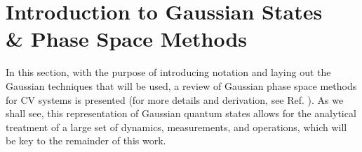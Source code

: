 \documentclass[%
reprint,
superscriptaddress,
nofootinbib,
 amsmath,amssymb,
prx,
floatfix,
]{revtex4-2}
\begin{document}








\section{Introduction to Gaussian States \\ \& Phase Space Methods \label{sec:intro_phase}}


In this section, with the purpose of introducing notation and laying out the Gaussian techniques that will be used, a review of Gaussian phase space methods for CV systems is presented (for more details and derivation, see Ref. \cite{serafini_quantum_2017}). As we shall see, this representation of Gaussian quantum states allows for the analytical treatment of a large set of dynamics, measurements, and operations, which will be key to the remainder of this work. 
\end{document}
